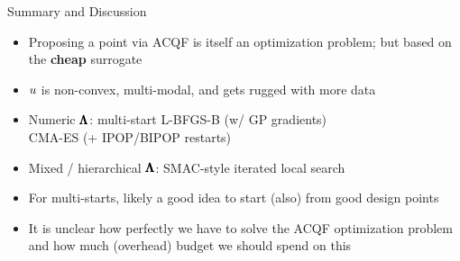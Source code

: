 \documentclass[main]{subfiles}
\begin{document}
\begin{frame}[t]{Summary and Discussion}
  \begin{itemize}
    \item Proposing a point via ACQF is itself an optimization problem;
    but based on the \textbf{cheap} surrogate
    \item $u$ is non-convex, multi-modal, and gets rugged with more data
    \item Numeric $\pmb{\Lambda}$: multi-start L-BFGS-B (w/ GP gradients)\\
    CMA-ES (+ IPOP/BIPOP restarts)
    \item Mixed / hierarchical $\pmb{\Lambda}$: SMAC-style iterated local search 
    \item For multi-starts, likely a good idea to start (also) from good design points 
    \item It is unclear how perfectly we have to solve the ACQF optimization problem
    and how much (overhead) budget we should spend on this
  \end{itemize}
\end{frame}
\end{document}

